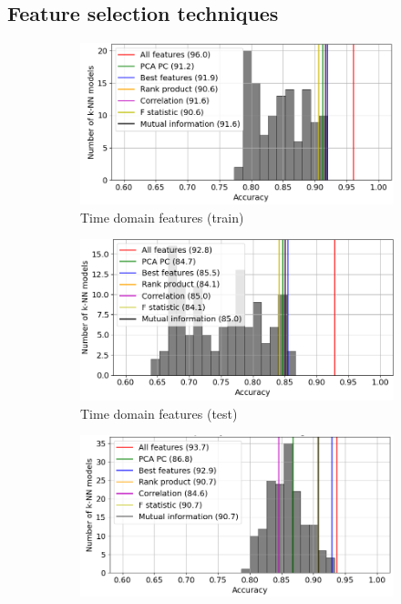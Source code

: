 \subsection{Feature selection techniques}


\begin{figure}[h]
    \centering
    \begin{subfigure}[b]{0.48\textwidth}
        \includegraphics[width=\textwidth]{assets/results/feature-combinations/model-distr-fsel-k5-f3-TD-train.png}
        \caption{Time domain features (train)}
    \end{subfigure}
    \hfill
    \begin{subfigure}[b]{0.48\textwidth}
        \includegraphics[width=\textwidth]{assets/results/feature-combinations/model-distr-fsel-k5-f3-TD-test.png}
        \caption{Time domain features (test)}
    \end{subfigure}
    \hfill
    \begin{subfigure}[b]{0.48\textwidth}
        \includegraphics[width=\textwidth]{assets/results/feature-combinations/model-distr-fsel-k5-f3-FD-train.png}

\end{subfigure}
\end{figure}
